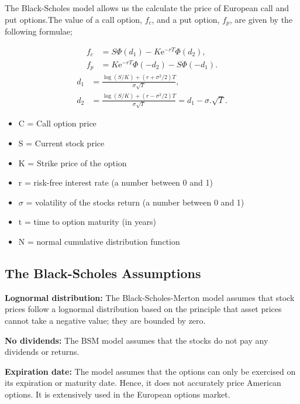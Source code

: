\documentclass[12pt]{article}
\begin{document}
	The Black-Scholes model allows us the calculate the price of European call and put options.The value of a call option, $f_c$, and a put option, $f_p$, are given by the following formulae;
	

\begin{align}
f_c &= S\Phi(d_1) - K \mathrm{e}^{-rT}\Phi(d_2)\label{eq:1}, \\
f_p &= K\mathrm{e}^{-rT}\Phi(-d_2) - S \Phi(-d_1).
\end{align}
\begin{align}
	d_1 &= \frac{\log(S/K)+(r+\sigma^2/2)T}{\sigma \sqrt{T}} \label{bsdii1}, \\
	d_2 &= \frac{\log(S/K)+(r-\sigma^2/2)T}{\sigma \sqrt{T}} = d_1 - \sigma. \sqrt{T}.
\end{align}
	
	
	

\begin{itemize}
	\item[] C = Call option price 
	\item[] S = Current stock price
	\item[] K = Strike price of the option
	\item[] r = risk-free interest rate (a number between 0 and 1)
	\item[] $\sigma$ = volatility of the stocks return (a number between 0 and 1)
	\item[] t = time to option maturity (in years)
	\item[] N = normal cumulative distribution function
\end{itemize}


	
	
	\subsection{The Black-Scholes Assumptions}
	
\textbf{Lognormal distribution:} The Black-Scholes-Merton model assumes that stock prices follow a lognormal distribution based on the principle that asset prices cannot take a negative value; they are bounded by zero.

\noindent
\textbf{No dividends:} The BSM model assumes that the stocks do not pay any dividends or returns.

\noindent
\textbf{Expiration date:} The model assumes that the options can only be exercised on its expiration or maturity date. Hence, it does not accurately price American options. It is extensively used in the European options market.
\end{document}
